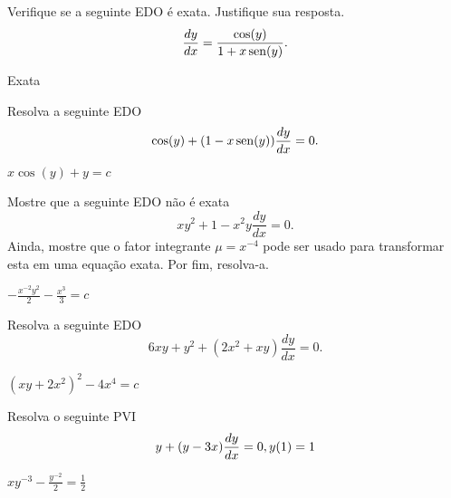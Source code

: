 \begin{exer}
  Verifique se a seguinte EDO é exata. Justifique sua resposta.
  \begin{equation}
    \frac{dy}{dx} = \frac{\cos(y)}{1+x\operatorname{sen}(y)}.
  \end{equation}
\end{exer}
\begin{resp}
  Exata
\end{resp}

\begin{exer}
  Resolva a seguinte EDO
  \begin{equation}
    \cos(y) + (1-x\operatorname{sen}(y))\frac{dy}{dx} = 0.
  \end{equation}
\end{exer}
\begin{resp}
  $x\cos(y) + y = c$
\end{resp}

\begin{exer}
  Mostre que a seguinte EDO não é exata
  \begin{equation}
    xy^2+1 - x^2y\frac{dy}{dx} = 0.
  \end{equation}
  Ainda, mostre que o fator integrante $\mu = x^{-4}$ pode ser usado para transformar esta em uma equação exata. Por fim, resolva-a.
\end{exer}
\begin{resp}
  $-\frac{x^{-2}y^2}{2}-\frac{x^3}{3} = c$
\end{resp}

\begin{exer}
  Resolva a seguinte EDO
  \begin{equation}
    6xy+y^2 + (2x^2+xy)\frac{dy}{dx} = 0.
  \end{equation}
\end{exer}
\begin{resp}
  $(xy+2x^2)^2-4x^4=c$
\end{resp}

\begin{exer}
  Resolva o seguinte PVI
  \begin{equation}
    y + (y-3x)\frac{dy}{dx} = 0,\\
    y(1)=1
  \end{equation}
\end{exer}
\begin{resp}
  $xy^{-3}-\frac{y^{-2}}{2} = \frac{1}{2}$
\end{resp}
